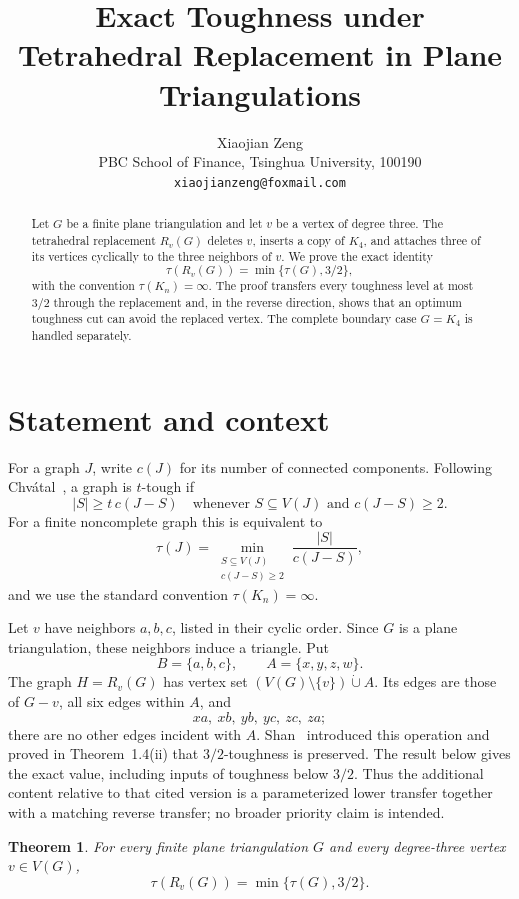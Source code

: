 \documentclass[11pt]{article}
\title{Exact Toughness under Tetrahedral Replacement in Plane Triangulations}
\author{Xiaojian Zeng\\
PBC School of Finance, Tsinghua University, 100190\\
\texttt{xiaojianzeng@foxmail.com}}
\date{}
\newtheorem{theorem}{Theorem}
\newcommand{\comp}{c}
\newcommand{\tough}{\tau}
\begin{document}
\maketitle

\begin{abstract}
Let \(G\) be a finite plane triangulation and let \(v\) be a vertex of
degree three.  The tetrahedral replacement \(R_v(G)\) deletes \(v\), inserts
a copy of \(K_4\), and attaches three of its vertices cyclically to the three
neighbors of \(v\).  We prove the exact identity
\[
  \tough(R_v(G))=\min\{\tough(G),3/2\},
\]
with the convention \(\tough(K_n)=\infty\).  The proof transfers every
toughness level at most \(3/2\) through the replacement and, in the reverse
direction, shows that an optimum toughness cut can avoid the replaced
vertex.  The complete boundary case \(G=K_4\) is handled separately.
\end{abstract}

\section{Statement and context}

For a graph \(J\), write \(\comp(J)\) for its number of connected components.
Following Chv\'{a}tal~\cite{Chvatal1973}, a graph is \(t\)-tough if
\[
  |S|\ge t\,\comp(J-S)
  \quad\text{whenever }S\subseteq V(J)\text{ and }\comp(J-S)\ge2.
\]
For a finite noncomplete graph this is equivalent to
\[
  \tough(J)=
  \min_{\substack{S\subseteq V(J)\\\comp(J-S)\ge2}}
       \frac{|S|}{\comp(J-S)},
\]
and we use the standard convention \(\tough(K_n)=\infty\).

Let \(v\) have neighbors \(a,b,c\), listed in their cyclic order.  Since
\(G\) is a plane triangulation, these neighbors induce a triangle.  Put
\[
 B=\{a,b,c\},\qquad A=\{x,y,z,w\}.
\]
The graph \(H=R_v(G)\) has vertex set
\((V(G)\setminus\{v\})\mathbin{\dot\cup}A\).  Its edges are those of
\(G-v\), all six edges within \(A\), and
\[
 xa,\ xb,\ yb,\ yc,\ zc,\ za;
\]
there are no other edges incident with \(A\).  Shan~\cite{Shan2026}
introduced this operation and proved in Theorem~1.4(ii) that
\(3/2\)-toughness is preserved.  The result below gives the exact value,
including inputs of toughness below \(3/2\).  Thus the additional content
relative to that cited version is a parameterized lower transfer together
with a matching reverse transfer; no broader priority claim is intended.

\begin{theorem}\label{thm:main}
For every finite plane triangulation \(G\) and every degree-three vertex
\(v\in V(G)\),
\[
  \tough(R_v(G))=\min\{\tough(G),3/2\}.
\]
\end{theorem}
\end{document}
